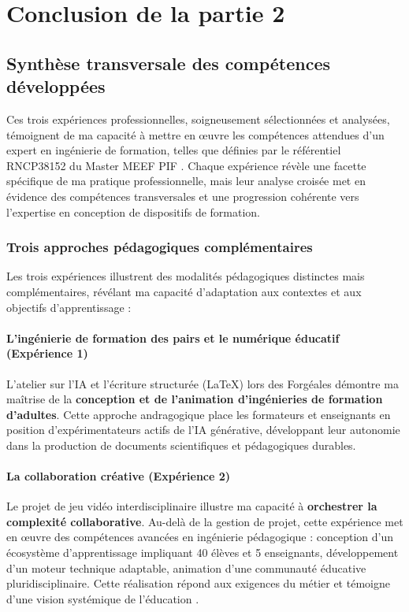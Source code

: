 \chapter{Conclusion de la partie 2}

\section{Synthèse transversale des compétences développées}

Ces trois expériences professionnelles, soigneusement sélectionnées et analysées, témoignent de ma capacité à mettre en œuvre les compétences attendues d'un expert en ingénierie de formation, telles que définies par le référentiel RNCP38152 du Master MEEF PIF \parencite{rncp38152}. Chaque expérience révèle une facette spécifique de ma pratique professionnelle, mais leur analyse croisée met en évidence des compétences transversales et une progression cohérente vers l'expertise en conception de dispositifs de formation.

\subsection{Trois approches pédagogiques complémentaires}

Les trois expériences illustrent des modalités pédagogiques distinctes mais complémentaires, révélant ma capacité d'adaptation aux contextes et aux objectifs d'apprentissage :

\subsubsection{L'ingénierie de formation des pairs et le numérique éducatif (Expérience 1)}

L'atelier sur l'IA et l'écriture structurée (\LaTeX{}) lors des Forgéales démontre ma maîtrise de la \textbf{conception et de l'animation d'ingénieries de formation d'adultes}. Cette approche andragogique \parencite{knowles_andragogy} place les formateurs et enseignants en position d'expérimentateurs actifs de l'IA générative, développant leur autonomie dans la production de documents scientifiques et pédagogiques durables.

\subsubsection{La collaboration créative (Expérience 2)}

Le projet de jeu vidéo interdisciplinaire illustre ma capacité à \textbf{orchestrer la complexité collaborative}. Au-delà de la gestion de projet, cette expérience met en œuvre des compétences avancées en ingénierie pédagogique : conception d'un écosystème d'apprentissage impliquant 40 élèves et 5 enseignants, développement d'un moteur technique adaptable, animation d'une communauté éducative pluridisciplinaire. Cette réalisation répond aux exigences du métier et témoigne d'une vision systémique de l'éducation \parencite{competences_transversales,projet_travail_groupe}.

